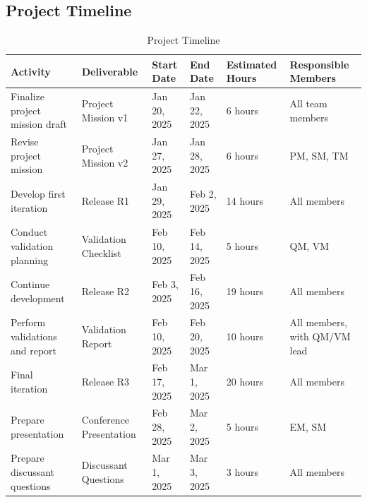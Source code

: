 \documentclass[a4paper]{article}
\begin{document}
\subsection{Project Timeline}
\begin{table}[h!]
\centering
\begin{tabular}{|p{3cm}|p{2cm}|l|l|p{2cm}|p{3cm}|}
\hline
\textbf{Activity}                   & \textbf{Deliverable}         & \textbf{Start Date} & \textbf{End Date} & \textbf{Estimated Hours} & \textbf{Responsible Members}      \\ \hline
Finalize project mission draft      & Project Mission v1           & Jan 20, 2025        & Jan 22, 2025      & 6 hours                  & All team members                  \\ \hline
Revise project mission              & Project Mission v2           & Jan 27, 2025        & Jan 28, 2025      & 6 hours                  & PM, SM, TM                        \\ \hline
Develop first iteration             & Release R1                   & Jan 29, 2025        & Feb 2, 2025       & 14 hours                 & All members                       \\ \hline
Conduct validation planning         & Validation Checklist         & Feb 10, 2025        & Feb 14, 2025      & 5 hours                  & QM, VM                            \\ \hline
Continue development                & Release R2                   & Feb 3, 2025         & Feb 16, 2025      & 19 hours                 & All members                       \\ \hline
Perform validations and report      & Validation Report            & Feb 10, 2025        & Feb 20, 2025      & 10 hours                 & All members, with QM/VM lead      \\ \hline
Final iteration                     & Release R3                   & Feb 17, 2025        & Mar 1, 2025       & 20 hours                 & All members                       \\ \hline
Prepare presentation                & Conference Presentation      & Feb 28, 2025        & Mar 2, 2025       & 5 hours                  & EM, SM                            \\ \hline
Prepare discussant questions        & Discussant Questions         & Mar 1, 2025         & Mar 3, 2025       & 3 hours                  & All members                       \\ \hline
\end{tabular}
\caption{Project Timeline}
\label{tab:project_timeline}
\end{table}
\end{document}
